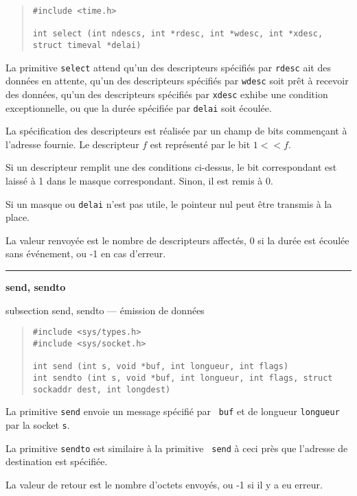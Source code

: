 \documentclass [twoside] {report}
\newcommand {\primitive} [1]
    {
	{\large \bf #1}
	\addcontentsline {toc} {subsection} {#1}
    }
\newcommand {\separation}
    {
	\vspace {7mm}
	\nopagebreak
	\hrule
    }
\begin{document}
\begin {quote}
\begin {verbatim}
#include <time.h>

int select (int ndescs, int *rdesc, int *wdesc, int *xdesc, struct timeval *delai)
\end{verbatim}
\end {quote}

La primitive {\tt select} attend qu'un des descripteurs
spécifiés par {\tt rdesc} ait des données en attente, qu'un
des descripteurs spécifiés par {\tt wdesc} soit prêt à
recevoir des données, qu'un des descripteurs spécifiés par
{\tt xdesc} exhibe une condition exceptionnelle, ou
que la durée spécifiée par {\tt delai} soit écoulée.

La spécification des descripteurs est réalisée par un champ
de bits commençant à l'adresse fournie. Le descripteur $f$
est représenté par le bit $1<<f$.

Si un descripteur remplit une des conditions ci-dessus, le
bit correspondant est laissé à 1 dans le masque
correspondant. Sinon, il est remis à 0.

Si un masque ou {\tt delai} n'est pas utile, le pointeur
nul peut être transmis à la place.

La valeur renvoyée est le nombre de descripteurs affectés,
0 si la durée est écoulée sans événement, ou -1 en cas
d'erreur.



\separation
\primitive {send, sendto} --- émission de données

\begin {quote}
\begin {verbatim}
#include <sys/types.h>
#include <sys/socket.h>

int send (int s, void *buf, int longueur, int flags)
int sendto (int s, void *buf, int longueur, int flags, struct sockaddr dest, int longdest)
\end{verbatim}
\end {quote}

La primitive {\tt send} envoie un message spécifié par {\tt
buf} et de longueur {\tt longueur} par la socket {\tt s}.

La primitive {\tt sendto} est similaire à la primitive {\tt
send} à ceci près que l'adresse de destination est
spécifiée.

La valeur de retour est le nombre d'octets envoyés, ou -1 si
il y a eu erreur.
\end{document}
